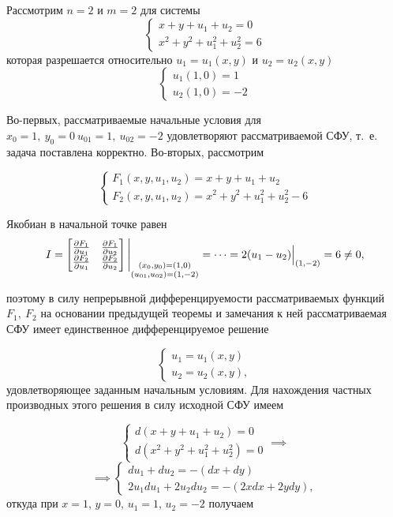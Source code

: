 \documentclass[../../main.tex]{subfiles}
\begin{document}
\begin{exmp}
    Рассмотрим $n = 2$ и $m = 2$ для системы
    \[
    \begin{cases}
        x + y + u_1 + u_2 = 0 \\
        x^2 + y^2 + u_1^2 + u_2^2 = 6
    \end{cases}
    \]
    которая разрешается относительно 
    $u_1 = u_1\left(x, y\right)$ и 
    $u_2 = u_2\left(x, y\right)$
    \[
    \begin{cases}
        u_1\left(1, 0\right) = 1\\
        u_2\left(1, 0\right) = -2
    \end{cases}
    \]
    
    Во-первых, рассматриваемые начальные условия для
    $x_0 = 1,\ y_0=0\ u_{01} = 1,\ u_{02} = -2$
    удовлетворяют рассматриваемой СФУ, т.~е. задача 
    поставлена корректно.
    Во-вторых, рассмотрим
    
    \[
    \begin{cases}
        F_1(x, y, u_1, u_2) = x + y + u_1 + u_2 \\
        F_2(x, y, u_1, u_2) = x^2 + y^2 + u_1^2 + u_2^2 - 6
    \end{cases}     
    \]
    
    Якобиан в начальной точке равен 
    \[
    I = \begin{bmatrix}
        \frac{\partial F_1}{\partial u_1} & \frac{\partial F_1}{\partial u_2} \\
        \frac{\partial F_2}{\partial u_1} & \frac{\partial F_2}{\partial u_2}
    \end{bmatrix}
    \Bigg|_{
    	\substack{
    		(x_0,y_0) = (1,0)\\
    		(u_{01},u_{02}) = (1,-2)
    	}} = \dots =  2(u_1 - u_2) \Big|_{(1, -2)} = 6 \neq 0,
    \]
    
    поэтому в силу непрерывной дифференцируемости рассматриваемых
    функций $F_1,\ F_2$ на основании
    предыдущей теоремы и замечания к ней 
    рассматриваемая СФУ имеет единственное 
    дифференцируемое решение
    
    \[
    \begin{cases}
        u_1 = u_1\left(x, y\right) \\
        u_2 = u_2\left(x, y\right), 
    \end{cases} 
    \]
    удовлетворяющее заданным начальным условиям.
    Для нахождения частных производных этого решения 
    в силу исходной СФУ имеем
    
    \[
    \begin{cases}
        d\left(x + y + u_1 + u_2\right) = 0 \\
        d\left(x^2 + y^2 + u_1^2 + u_2^2\right) = 0
    \end{cases} \implies
    \]
    \[
    \implies
    \begin{cases}
        du_1 + du_2 = -\left(dx + dy\right)\\
        2u_1du_1 + 2u_2du_2 = -\left(2xdx + 2ydy\right),
    \end{cases}
    \]
    откуда при $x = 1$, $y = 0$, $u_1 = 1$, $u_2 = -2$
    получаем
    

\end{exmp}
\end{document}
